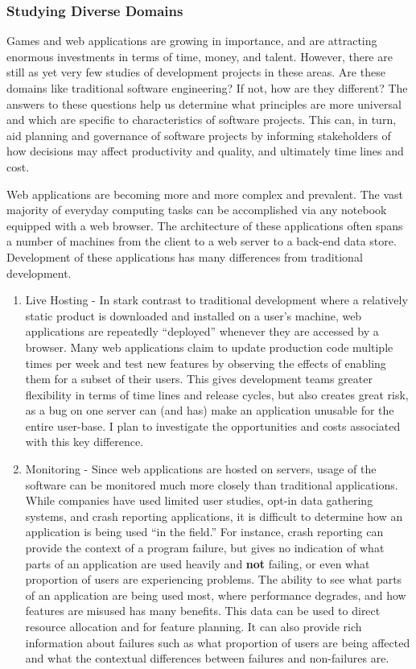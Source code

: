 \documentclass[10pt]{article}
\newcommand\Subsection[1]{\subsubsection*{\small #1}}
\begin{document}
\begin{small}
\Subsection{Studying Diverse Domains}

Games and web applications are growing in importance, and are attracting
enormous investments in terms of time, money, and talent. However, there are
still as yet very few studies of development projects in these areas. Are these
domains like traditional software engineering? If not, how are they different?
The answers to these questions help us determine what principles are more
universal and which are specific to characteristics of software projects.  This
can, in turn, aid planning and governance of software projects by informing
stakeholders of how decisions may affect productivity and quality, and ultimately
time lines and cost.

Web applications are becoming more and more complex and prevalent.  The vast
majority of everyday computing tasks can be accomplished via any notebook
equipped with a web browser.  The architecture of these applications often spans a number of
machines from the client to a web server to a back-end data store.  Development of these
applications has many differences from traditional development.

\begin{enumerate}

\item Live Hosting - 
    In stark contrast to traditional development where a relatively static
    product is downloaded and installed on a user's machine, web applications are repeatedly ``deployed''
    whenever they are accessed by a browser.  Many web applications 
    claim to update production code multiple times per week and 
    test new features by observing the effects of enabling them for a subset of their users. 
    This gives development teams greater flexibility in terms of time lines and release cycles, but
    also creates great risk, as a bug on one server can (and has) make an application unusable
    for the entire user-base.
    I plan to investigate the opportunities and costs associated with this key difference.

\item Monitoring - Since web applications are hosted on servers, usage of the software
    can be monitored much more closely than traditional applications.  While companies have used limited
    user studies, opt-in data gathering systems, and crash reporting applications, it is difficult
    to determine how an application is being used ``in the field.'' For instance, crash reporting
    can provide the context of a program failure, but gives no indication of what parts of an application
    are used heavily and \textbf{not} failing, or even what proportion of users are experiencing problems.
    The ability to see what parts of an application are being used most, where
    performance degrades, and how features are misused has many benefits.  
    This data can be used to direct resource allocation and for
    feature planning.  It can also provide rich information about failures such as what proportion of users 
    are being affected and what the contextual differences between failures and non-failures are.


\end{enumerate}
\end{small}
\end{document}
